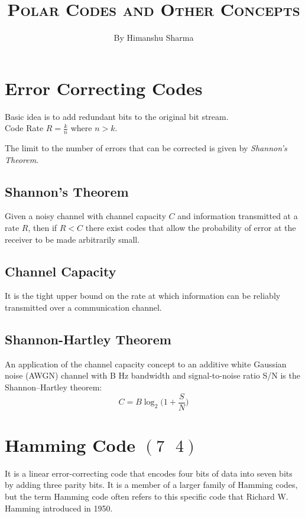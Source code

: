 \documentclass{report}
\title{\Huge \textsc{Polar Codes and Other Concepts}}
\author{By Himanshu Sharma}
\date{}
\begin{document}
\maketitle

\section{Error Correcting Codes}
Basic idea is to add redundant bits to the original bit stream. \\
Code Rate $R = \displaystyle \frac{k}{n}$ where $n > k$. 

The limit to the number of errors that can be corrected is given by {\it Shannon's Theorem}.
\subsection{Shannon's Theorem}
Given a noisy channel with channel capacity $C$ and information transmitted at a rate $R$, then if $R < C$ there exist codes that allow the probability of error at the receiver to be made arbitrarily small.
\subsection{Channel Capacity}
It is the tight upper bound on the rate at which information can be reliably transmitted over a communication channel. 
\subsection{Shannon-Hartley Theorem}
An application of the channel capacity concept to an additive white Gaussian noise (AWGN) channel with B Hz bandwidth and signal-to-noise ratio S/N is the Shannon–Hartley theorem:  \\

\begin{equation}
C = B \log_{2}\Bigg(1+\frac{S}{N}\Bigg)
\end{equation}

\section{Hamming Code $(7 \textrm{ } 4)$}
It is a linear error-correcting code that encodes four bits of data into seven bits by adding three parity bits. It is a member of a larger family of Hamming codes, but the term Hamming code often refers to this specific code that Richard W. Hamming introduced in 1950.
\end{document}
